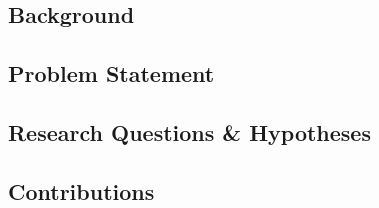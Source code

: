 \subsection{Background}

\subsection{Problem Statement}

\subsection{Research Questions \& Hypotheses}

\subsection{Contributions}
